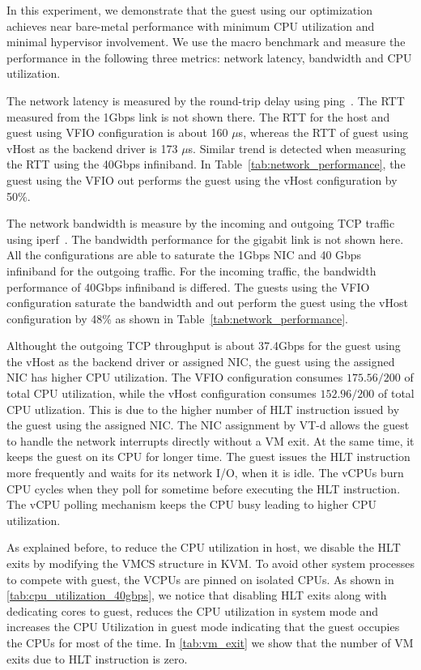 In this experiment, we demonstrate that the guest using our
optimization achieves near bare-metal performance with minimum
CPU utilization and minimal hypervisor involvement. We use the
macro benchmark and measure the performance in the following
three metrics: network latency, bandwidth and CPU utilization.

The network latency is measured by the round-trip delay using
ping~\cite{ping}. The RTT measured from the 1Gbps link is not
shown there. The RTT for the host and guest using VFIO
configuration is about 160 $\mu$s, whereas the RTT of guest
using vHost as the backend driver is 173 $\mu$s. Similar trend
is detected when measuring the RTT using the 40Gbps
infiniband. In Table~\ref{tab:network_performance}, the guest
using the VFIO out performs the guest using the vHost
configuration by 50\%.

The network bandwidth is measure by the incoming and outgoing
TCP traffic using iperf~\cite{iperf}. The bandwidth
performance for the gigabit link is not shown here. All the
configurations are able to saturate the 1Gbps NIC and 40 Gbps
infiniband for the outgoing traffic. For the incoming traffic,
the bandwidth performance of 40Gbps infiniband is differed.
The guests using the VFIO configuration saturate the bandwidth
and out perform the guest using the vHost configuration by
48\% as shown in Table~\ref{tab:network_performance}.

Althought the outgoing TCP throughput is about 37.4Gbps for
the guest using the vHost as the backend driver or assigned
NIC, the guest using the assigned NIC has higher CPU
utilization. The VFIO configuration consumes $175.56/200$ of
total CPU utilization, while the vHost configuration consumes
$152.96/200$ of total CPU utlization. This is due to the
higher number of HLT instruction issued by the guest using the
assigned NIC. The NIC assignment by VT-d allows the guest to
handle the network interrupts directly without a VM exit. At
the same time, it keeps the guest on its CPU for longer time.
The guest issues the HLT instruction more frequently and waits
for its network I/O, when it is idle. The vCPUs burn CPU
cycles when they poll for sometime before executing the HLT
instruction. The vCPU polling mechanism keeps the CPU busy
leading to higher CPU utilization.

As explained before, to reduce the CPU utilization in host, we
disable the HLT exits by modifying the VMCS structure in KVM.
To avoid other system processes to compete with guest, the
VCPUs are pinned on isolated CPUs. As shown in
\ref{tab:cpu_utilization_40gbps}, we notice that disabling HLT
exits along with dedicating cores to guest, reduces the CPU
utilization in system mode and increases the CPU Utilization
in guest mode indicating that the guest occupies the CPUs for
most of the time. In \ref{tab:vm_exit} we show that the number
of VM exits due to HLT instruction is zero.
